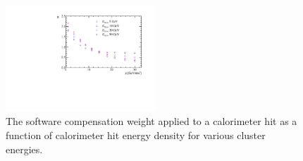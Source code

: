 \begin{figure}
\caption[]{}
\label{fig:softcompparams}
\end{figure}

\begin{figure}
\includegraphics[width=0.5\textwidth]{EnergyEstimators/Plots/SoftComp/Weights/SoftwareCompensationWeights.pdf}
\caption[The software compensation weight applied to a calorimeter hit as a function of calorimeter hit energy density for various cluster energies.]{The software compensation weight applied to a calorimeter hit as a function of calorimeter hit energy density for various cluster energies.}
\label{fig:softcompweights}
\end{figure}

